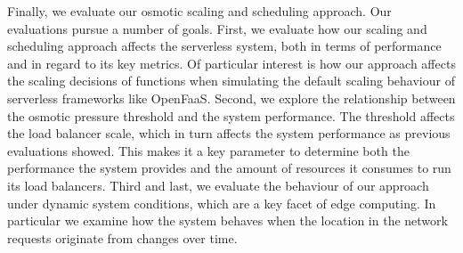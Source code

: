 Finally, we evaluate our osmotic scaling and scheduling approach.
Our evaluations pursue a number of goals.
First, we evaluate how our scaling and scheduling approach affects the serverless system, both in terms of performance and in regard to its key metrics.
Of particular interest is how our approach affects the scaling decisions of functions when simulating the default scaling behaviour of serverless frameworks like OpenFaaS\cite{openfaas}.
Second, we explore the relationship between the osmotic pressure threshold and the system performance.
The threshold affects the load balancer scale, which in turn affects the system performance as previous evaluations showed.
This makes it a key parameter to determine both the performance the system provides and the amount of resources it consumes to run its load balancers.
Third and last, we evaluate the behaviour of our approach under dynamic system conditions, which are a key facet of edge computing.
In particular we examine how the system behaves when the location in the network requests originate from changes over time.



